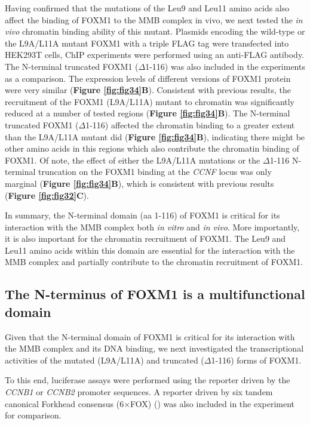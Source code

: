 Having confirmed that the mutations of the Leu9 and Leu11 amino acids also affect the binding of FOXM1 to the MMB complex in vivo, we next tested the \textit{in vivo} chromatin binding ability of this mutant. Plasmids encoding the wild-type or the L9A/L11A mutant FOXM1 with a triple FLAG tag were transfected into HEK293T cells, ChIP experiments were performed using an anti-FLAG antibody. The N-terminal truncated FOXM1 ($\Delta$1-116) was also included in the experiments as a comparison. The expression levels of different versions of FOXM1 protein were very similar (\textbf{Figure \ref{fig:fig34}B}). Consistent with previous results, the recruitment of the FOXM1 (L9A/L11A) mutant to chromatin was significantly reduced at a number of tested regions (\textbf{Figure \ref{fig:fig34}B}). The N-terminal truncated FOXM1 ($\Delta$1-116) affected the chromatin binding to a greater extent than the L9A/L11A mutant did (\textbf{Figure \ref{fig:fig34}B}), indicating there might be other amino acids in this regions which also contribute the chromatin binding of FOXM1. Of note, the effect of either the L9A/L11A mutations or the $\Delta$1-116 N-terminal truncation on the FOXM1 binding at the \textit{CCNF} locus was only marginal (\textbf{Figure \ref{fig:fig34}B}), which is consistent with previous results (\textbf{Figure \ref{fig:fig32}C}).

In summary, the N-terminal domain (aa 1-116) of FOXM1 is critical for its interaction with the MMB complex both \textit{in vitro} and \textit{in vivo}. More importantly, it is also important for the chromatin recruitment of FOXM1. The Leu9 and Leu11 amino acids within this domain are essential for the interaction with the MMB complex and partially contribute to the chromatin recruitment of FOXM1.

\subsection{The N-terminus of FOXM1 is a multifunctional domain}

Given that the N-terminal domain of FOXM1 is critical for its interaction with the MMB complex and its DNA binding, we next investigated the transcriptional activities of the mutated (L9A/L11A) and truncated ($\Delta$1-116) forms of FOXM1.

To this end, luciferase assays were performed using the reporter driven by the \textit{CCNB1} or \textit{CCNB2} promoter sequences. A reporter driven by six tandem canonical Forkhead consensus (6$\times$FOX) (\cite{samadani1996the}) was also included in the experiment for comparison.

